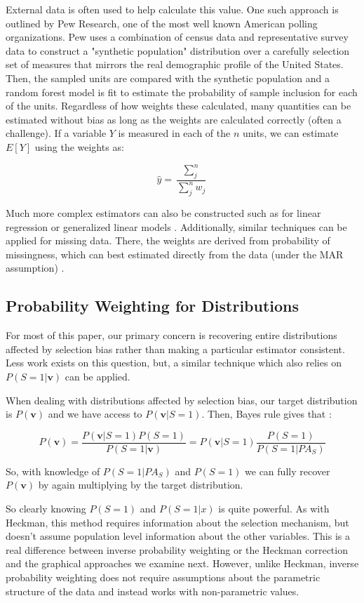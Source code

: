 \documentclass[12pt,twoside]{reedthesis}
\theoremstyle{definition}
\begin{document}
External data is often used to help calculate this value. One such approach is outlined by Pew Research, one of the most well known American polling organizations. Pew uses a combination of census data and representative survey data to construct a "synthetic population" distribution over a carefully selection set of measures that mirrors the real demographic profile of the United States. Then, the sampled units are compared with the synthetic population and a random forest model is fit to estimate the probability of sample inclusion for each of the units. Regardless of how weights these calculated, many quantities can be estimated without bias as long as the weights are calculated correctly (often a challenge). If a variable $Y$ is measured in each of the $n$ units, we can estimate $E[Y]$ using the weights as:

$$\hat y = \frac{\sum_j^n }{\sum_j^n w_j}$$

Much more complex estimators can also be constructed such as for linear regression or generalized linear models \citep{Haneuse_2009}. Additionally, similar techniques can be applied for missing data. There, the weights are derived from probability of missingness, which can best estimated directly from the data (under the MAR assumption)  \citep{Seaman_2011}.

\subsection{Probability Weighting for Distributions}

For most of this paper, our primary concern is recovering entire distributions affected by selection bias rather than making a particular estimator consistent. Less work exists on this question, but, a similar technique which also relies on $P(S=1 | \mathbf{v})$ can be applied. 

When dealing with distributions affected by selection bias, our target distribution is $P(\mathbf{v})$ and we have access to $P(\mathbf{v} | S = 1)$. Then, Bayes rule gives that \citep{Cortes_2008}:

$$P(\mathbf{v}) = \frac{P(\mathbf{v}  | S = 1)P(S = 1)}{P(S=1 | \mathbf{v})} = P(\mathbf{v}  | S = 1) \frac{P(S = 1)}{P(S=1 | PA_{S})}$$

So, with knowledge of $P(S=1 | PA_S)$ and $P(S = 1)$ we can fully recover $P(\mathbf{v})$ by again multiplying by the target distribution. 

So clearly knowing $P(S = 1)$ and $P(S = 1|x)$ is quite powerful. As with Heckman, this method requires information about the selection mechanism, but doesn't assume population level information about the other variables. This is a real difference between inverse probability weighting or the Heckman correction and the graphical approaches we examine next. However, unlike Heckman, inverse probability weighting does not require  assumptions about the parametric structure of the data and instead works with non-parametric values.   
\end{document}
